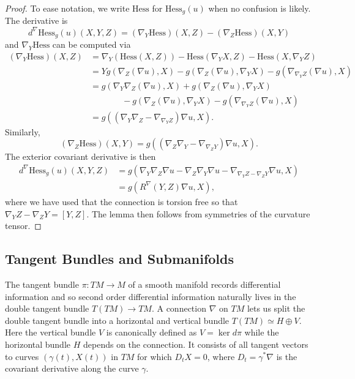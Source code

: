 \documentclass{amsart}
\numberwithin{equation}{section}
\begin{document}
\begin{proof}
To ease notation, we write $\mathrm{Hess}$ for $\mathrm{Hess}_g(u)$ when no confusion is likely.
The derivative is
\[
d^\nabla\mathrm{Hess}_g(u)(X,Y,Z) = (\nabla_Y\mathrm{Hess})(X,Z) - (\nabla_Z \mathrm{Hess})(X,Y)
\]
and $\nabla_Y\mathrm{Hess}$ can be computed via
\begin{align*}
(\nabla_Y\mathrm{Hess})(X,Z)
&= \nabla_Y(\mathrm{Hess}(X,Z)) - \mathrm{Hess}(\nabla_YX,Z) - \mathrm{Hess}(X,\nabla_YZ) \\
&= Yg(\nabla_Z(\nabla u),X) - g(\nabla_Z(\nabla u ), \nabla_YX) - g(\nabla_{\nabla_YZ}(\nabla u),X) \\
&= g(\nabla_Y \nabla_Z (\nabla u ), X) + g(\nabla_Z(\nabla u), \nabla_YX) \\
&\phantom{=} \hspace{1cm}  - g(\nabla_Z(\nabla u ), \nabla_YX) - g(\nabla_{\nabla_YZ}(\nabla u),X) \\
&= g( (\nabla_Y \nabla_Z  - \nabla_{\nabla_YZ})\nabla u, X).
\end{align*}
Similarly, 
\[
(\nabla_Z \mathrm{Hess})(X,Y) = g( (\nabla_Z \nabla_Y  - \nabla_{\nabla_ZY})\nabla u, X).
\]
The exterior covariant derivative is then 
\begin{align*}
d^\nabla\mathrm{Hess}_g(u)(X,Y,Z)
&= g( \nabla_Y \nabla_Z \nabla u - \nabla_Z \nabla_Y \nabla u - \nabla_{\nabla_YZ - \nabla_ZY} \nabla u , X) \\
&= g( R^\nabla(Y,Z)\nabla u ,X),
\end{align*}
where we have used that the connection is torsion free so that $\nabla_YZ - \nabla_ZY = [Y,Z]$.
The lemma then follows from symmetries of the curvature tensor. 
\end{proof}


\subsection{Tangent Bundles and Submanifolds}

The tangent bundle $\pi:TM \to M$ of a smooth manifold records differential information and so second order differential information naturally lives in the double tangent bundle $T(TM) \to TM$.
A connection $\nabla$ on $TM$ lets us split the double tangent bundle into a horizontal and vertical bundle $T(TM) \simeq H \oplus V$.
Here the vertical bundle $V$ is canonically defined as $V = \ker d\pi$ while the horizontal bundle $H$ depends on the connection.
It consists of all tangent vectors to curves $(\gamma(t),X(t))$ in $TM$ for which $D_tX = 0$, where $D_t = \gamma^*\nabla$ is the covariant derivative along the curve $\gamma$.
\end{document}
